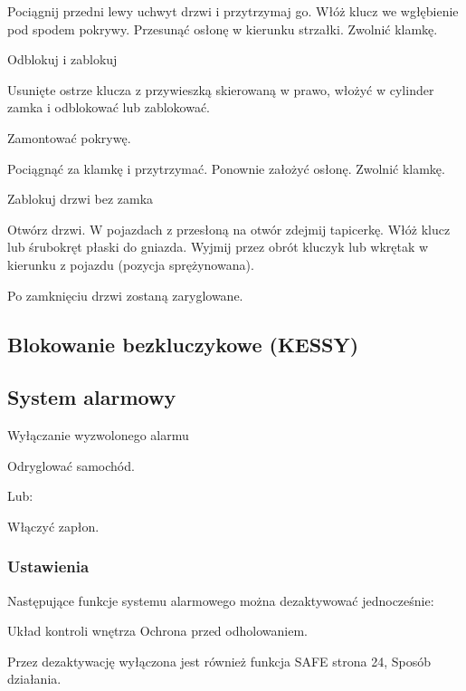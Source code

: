 \begin{itemizeArrow}
	\itemArrow Pociągnij przedni lewy uchwyt drzwi i przytrzymaj go.
	\itemArrow Włóż klucz we wgłębienie pod spodem pokrywy.
	\itemArrow Przesunąć osłonę w kierunku strzałki.
	\itemArrow Zwolnić klamkę.
\end{itemizeArrow}

Odblokuj i zablokuj

\begin{itemizeArrow}
	\itemArrow Usunięte ostrze klucza z przywieszką skierowaną w prawo, włożyć w cylinder zamka i odblokować lub zablokować.
\end{itemizeArrow}

Zamontować pokrywę.
\begin{itemizeArrow}
	\itemArrow Pociągnąć za klamkę i przytrzymać.
	\itemArrow Ponownie założyć osłonę.
	\itemArrow Zwolnić klamkę.
\end{itemizeArrow}

Zablokuj drzwi bez zamka

\begin{itemizeArrow}
	\itemArrow Otwórz drzwi.
	\itemArrow W pojazdach z przesłoną na otwór zdejmij tapicerkę.
	\itemArrow Włóż klucz lub śrubokręt płaski do gniazda.
	\itemArrow Wyjmij przez obrót kluczyk lub wkrętak w kierunku z pojazdu (pozycja sprężynowana).
\end{itemizeArrow}
Po zamknięciu drzwi zostaną zaryglowane.

\subsection{Blokowanie bezkluczykowe (KESSY)}

\subsection{System alarmowy}

Wyłączanie wyzwolonego alarmu
\begin{itemizeArrow}
	\itemArrow Odryglować samochód.
\end{itemizeArrow}
Lub:
\begin{itemizeArrow}
	\itemArrow Włączyć zapłon.
\end{itemizeArrow}



\subsubsection{Ustawienia}
Następujące funkcje systemu alarmowego można dezaktywować jednocześnie:
\begin{itemizeTriangle}
	\itemTriangle Układ kontroli wnętrza
	\itemTriangle Ochrona przed odholowaniem.
\end{itemizeTriangle}
Przez dezaktywację wyłączona jest również funkcja SAFE \guillemotright strona 24, Sposób działania.

